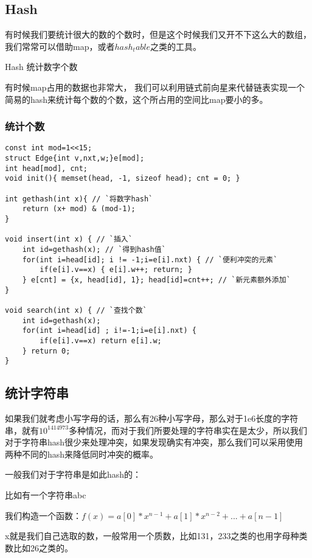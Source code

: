 \subsection{Hash}


有时候我们要统计很大的数的个数时，但是这个时候我们又开不下这么大的数组，我们常常可以借助map，或者$hash_table$之类的工具。

Hash 统计数字个数

有时候map占用的数据也非常大， 我们可以利用链式前向星来代替链表实现一个简易的hash来统计每个数的个数，这个所占用的空间比map要小的多。

\subsubsection{统计个数}

\begin{lstlisting}
const int mod=1<<15;
struct Edge{int v,nxt,w;}e[mod];
int head[mod], cnt;
void init(){ memset(head, -1, sizeof head); cnt = 0; }

int gethash(int x){ // `将数字hash`
    return (x+ mod) & (mod-1);
}

void insert(int x) { // `插入`
    int id=gethash(x); // `得到hash值`
    for(int i=head[id]; i != -1;i=e[i].nxt) { // `便利冲突的元素`
        if(e[i].v==x) { e[i].w++; return; }
    } e[cnt] = {x, head[id], 1}; head[id]=cnt++; // `新元素额外添加`
}

void search(int x) { // `查找个数`
    int id=gethash(x);
    for(int i=head[id] ; i!=-1;i=e[i].nxt) {
        if(e[i].v==x) return e[i].w;
    } return 0;
}
\end{lstlisting}

\subsection{统计字符串}

如果我们就考虑小写字母的话，那么有26种小写字母，那么对于1e6长度的字符串，就有$10^{1414973}$多种情况，而对于我们所要处理的字符串实在是太少，所以我们对于字符串hash很少来处理冲突，如果发现确实有冲突，那么我们可以采用使用两种不同的hash来降低同时冲突的概率。

一般我们对于字符串是如此hash的：

比如有一个字符串abc

我们构造一个函数：$f(x) = a[0]*x^{n-1} + a[1]*x^{n-2} + ... + a[n-1]$

x就是我们自己选取的数，一般常用一个质数，比如131，233之类的也用字母种类数比如26之类的。

